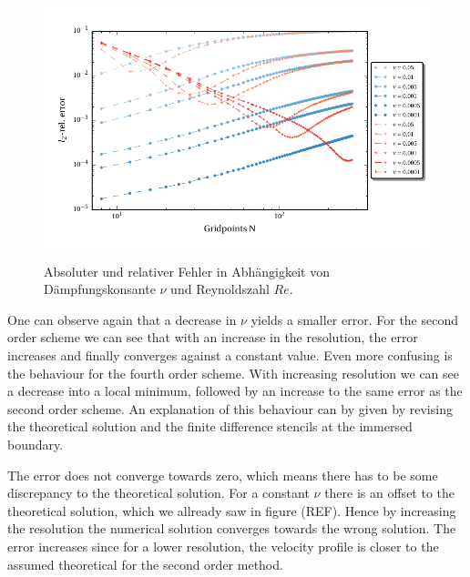 \begin{figure}[!t]
  \centering
  \includegraphics{gfx/immersed_boundary/poiseuille_flow/2_vp/vp_convergence.pdf}\label{fig:vp_conv}
  \caption{Absoluter und relativer Fehler in Abhängigkeit von Dämpfungskonsante $\nu$ und Reynoldszahl $Re$.}
\end{figure}
One can observe again that a decrease in $\nu$  yields a smaller error.
For the second order scheme we can see that with an increase in the resolution, the error increases and finally converges against a constant value.
Even more confusing is the behaviour for the fourth order scheme.
With increasing resolution we can see a decrease into a local minimum, followed by an increase to the same error as the second order scheme.
An explanation of this behaviour can by given by revising the theoretical solution and the finite difference stencils at the immersed boundary.

The error does not converge towards zero, which means there has to be some discrepancy to the theoretical solution.
For a constant $\nu$ there is an offset to the theoretical solution, which we allready saw in figure (REF).
Hence by increasing the resolution the numerical solution converges towards the wrong solution.
The error increases since for a lower resolution, the velocity profile is closer to the assumed theoretical for the second order method.

